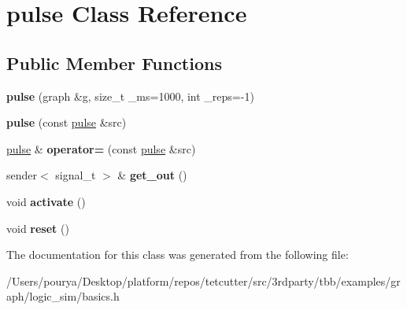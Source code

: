 \hypertarget{classpulse}{}\section{pulse Class Reference}
\label{classpulse}
\subsection*{Public Member Functions}
\begin{DoxyCompactItemize}
\item 
\hypertarget{classpulse_a5ab7987cd8d73e93b3970859891736df}{}{\bfseries pulse} (graph \&g, size\+\_\+t \+\_\+ms=1000, int \+\_\+reps=-\/1)\label{classpulse_a5ab7987cd8d73e93b3970859891736df}

\item 
\hypertarget{classpulse_ad6be7bc22d35c6f8333218255d7efa36}{}{\bfseries pulse} (const \hyperlink{classpulse}{pulse} \&src)\label{classpulse_ad6be7bc22d35c6f8333218255d7efa36}

\item 
\hypertarget{classpulse_a404e9574d9ad86a309d26f3d481f253c}{}\hyperlink{classpulse}{pulse} \& {\bfseries operator=} (const \hyperlink{classpulse}{pulse} \&src)\label{classpulse_a404e9574d9ad86a309d26f3d481f253c}

\item 
\hypertarget{classpulse_a07e8ef028694a490048ade18546b7d76}{}sender$<$ signal\+\_\+t $>$ \& {\bfseries get\+\_\+out} ()\label{classpulse_a07e8ef028694a490048ade18546b7d76}

\item 
\hypertarget{classpulse_a63d8938fc1fac1d5f1eb5232c5252cfc}{}void {\bfseries activate} ()\label{classpulse_a63d8938fc1fac1d5f1eb5232c5252cfc}

\item 
\hypertarget{classpulse_afbdfe97061c52eb3209fbcd9e99c46bf}{}void {\bfseries reset} ()\label{classpulse_afbdfe97061c52eb3209fbcd9e99c46bf}

\end{DoxyCompactItemize}


The documentation for this class was generated from the following file\+:\begin{DoxyCompactItemize}
\item 
/\+Users/pourya/\+Desktop/platform/repos/tetcutter/src/3rdparty/tbb/examples/graph/logic\+\_\+sim/basics.\+h\end{DoxyCompactItemize}
